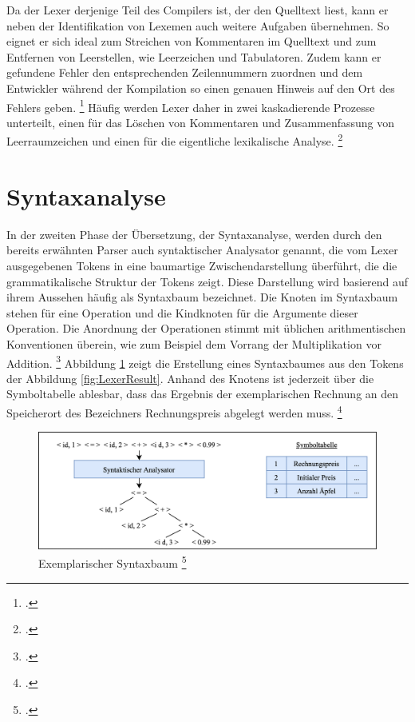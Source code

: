 Da der Lexer derjenige Teil des Compilers ist, der den Quelltext liest, kann er neben der Identifikation von Lexemen auch weitere Aufgaben übernehmen. So eignet er sich ideal zum Streichen von Kommentaren im Quelltext und zum Entfernen von Leerstellen,  wie Leerzeichen und Tabulatoren.  Zudem kann er gefundene Fehler den entsprechenden Zeilennummern zuordnen und dem Entwickler während der Kompilation so einen genauen Hinweis auf den Ort des Fehlers geben. \footcite[Vgl.][S. 135.]{Ullmann2008} 
Häufig werden Lexer daher in zwei kaskadierende Prozesse unterteilt, einen für das Löschen von Kommentaren und Zusammenfassung von Leerraumzeichen und einen für die eigentliche lexikalische Analyse.  \footcite[Vgl.][S. 136.]{Ullmann2008} 

\section{Syntaxanalyse}
In der zweiten Phase der Übersetzung, der Syntaxanalyse,  werden durch den bereits erwähnten Parser auch syntaktischer Analysator genannt,  die vom Lexer ausgegebenen Tokens in eine baumartige Zwischendarstellung überführt, die die grammatikalische Struktur der Tokens zeigt.  Diese Darstellung wird basierend auf ihrem Aussehen häufig als Syntaxbaum bezeichnet.  Die Knoten im Syntaxbaum stehen für eine Operation und die Kindknoten für die Argumente dieser Operation.  Die Anordnung der Operationen stimmt mit üblichen arithmentischen Konventionen überein,  wie zum Beispiel dem Vorrang der Multiplikation vor Addition. \footcite[Vgl.][S. 9]{Ullmann2008} Abbildung \ref{fig:ParserResult} zeigt die Erstellung eines Syntaxbaumes aus den Tokens  der Abbildung \ref{fig:LexerResult}.  Anhand des Knotens \grq{} ist jederzeit über die Symboltabelle ablesbar,  dass das Ergebnis der exemplarischen Rechnung an den Speicherort des Bezeichners Rechnungspreis abgelegt werden muss. \footcite[Vgl.][S. 9.]{Ullmann2008} 

\begin{figure}[!ht]
 \includegraphics[width=\textwidth,keepaspectratio]{Images/Compiler/ParserResult.png}
 \caption[Exemplarischer Syntaxbaum]{Exemplarischer Syntaxbaum \protect\footcite{Ullmann2008} }
 \label{fig:ParserResult}
\end{figure}

